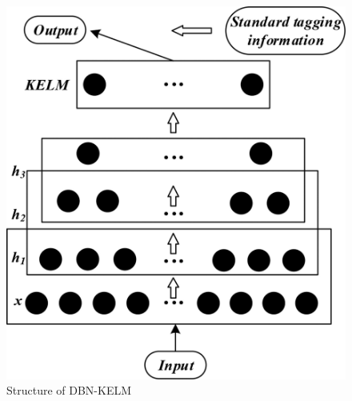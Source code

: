 \begin{figure}
	\centering
	\includegraphics[height=0.3\textheight,keepaspectratio]{img/dbn-kelm.jpg}
	\caption{Structure of DBN-KELM \cite{Han.2020}}
	\label{fig:dbn-kelm}
\end{figure}
